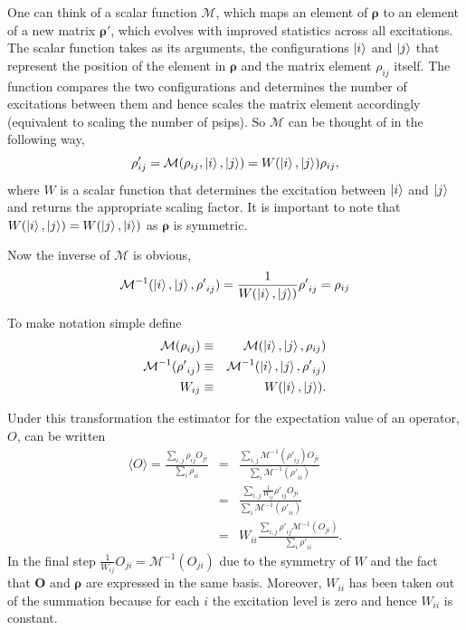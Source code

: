 One can think of a scalar function $\mathcal{M}$, which maps an element of $\bm{\rho}$ to an element of a new matrix $\bm{\rho}'$, which evolves with improved statistics across all excitations. The scalar function takes as its arguments, the configurations $\ket{i}$ and $\ket{j}$ that represent the position of the element in $\bm{\rho}$ and the matrix element $\rho_{ij}$ itself. The function compares the two configurations and determines the number of excitations between them and hence scales the matrix element accordingly (equivalent to scaling the number of psips). So $\mathcal{M}$ can be thought of in the following way,
\begin{equation}
\rho'_{ij} = \mathcal{M}(\rho_{ij},\ket{i},\ket{j}) = W(\ket{i},\ket{j})\rho_{ij},
\label{eq:importanceSamplingTransformation}
\end{equation}
where $W$ is a scalar function that determines the excitation between $\ket{i}$ and $\ket{j}$ and returns the appropriate scaling factor. It is important to note that $W(\ket{i},\ket{j}) = W(\ket{j},\ket{i})$ as $\bm{\rho}$ is symmetric.

Now the inverse of $\mathcal{M}$ is obvious,
\begin{equation}
\mathcal{M}^{-1}(\ket{i},\ket{j},{\rho'}_{ij}) =  \frac{1}{W(\ket{i},\ket{j})}{\rho'}_{ij} = \rho_{ij}
\end{equation}

To make notation simple define
\begin{eqnarray}
\mathcal{M}({\rho}_{ij})  &\equiv& \mathcal{M}(\ket{i},\ket{j},\rho_{ij}) \\
\mathcal{M}^{-1}({\rho'}_{ij})  &\equiv& \mathcal{M}^{-1}(\ket{i},\ket{j},{\rho'}_{ij}) \\
W_{ij} &\equiv& W(\ket{i},\ket{j}).
\end{eqnarray}

Under this transformation the estimator for the expectation value of an operator, $O$, can be written
\begin{eqnarray}
\langle O \rangle = \frac{\sum_{i,j}\rho_{ij}O_{ji}}{\sum_{i}\rho_{ii}} &= & \frac{\sum_{i,j}\mathcal{M}^{-1}({\rho'}_{ij})O_{ji}}{\sum_{i}\mathcal{M}^{-1}({\rho'}_{ii})}\\
&=& \frac{\sum_{i,j}\frac{1}{W_{ij}}{\rho'}_{ij}O_{ji}}{\sum_{i}\mathcal{M}^{-1}({\rho'}_{ii})}\\
&=& W_{ii}\frac{\sum_{i,j}{\rho'}_{ij}\mathcal{M}^{-1}(O_{ji})}{\sum_{i}{\rho'}_{ii}}.
\label{eq:importanceSampledEstimator}
\end{eqnarray}
In the final step $\frac{1}{W_{ij}}O_{ji} = \mathcal{M}^{-1}(O_{ji})$ due to the symmetry of $W$ and the fact that $\bm{O}$ and $\bm{\rho}$ are expressed in the same basis. Moreover, $W_{ii}$ has been taken out of the summation because for each $i$ the excitation level is zero and hence $W_{ii}$ is constant.

